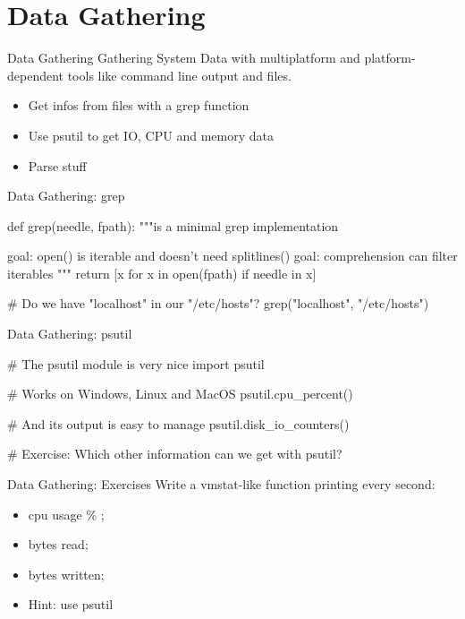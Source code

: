 \section{Data Gathering}
%
%


\begin{frame}{Data Gathering}
    Gathering System Data with multiplatform
     and platform-dependent tools like command
     line output and files.

\begin{itemize}
\item Get infos from files with a grep function
\item Use psutil to get IO, CPU and memory data
\item Parse stuff
\end{itemize}

\end{frame}


\begin{frame}[fragile]{Data Gathering: grep}
\begin{pythoncode}
def grep(needle, fpath):
    """is a minimal grep implementation

       goal: open() is iterable and doesn't
             need splitlines()
       goal: comprehension can filter iterables
    """
    return [x for x in open(fpath) if needle in x]
    
# Do we have "localhost" in our "/etc/hosts"?
grep("localhost", "/etc/hosts")
\end{pythoncode}
\end{frame}


\begin{frame}[fragile]{Data Gathering: psutil}
\begin{pythoncode}
# The psutil module is very nice
import psutil

# Works on Windows, Linux and MacOS
psutil.cpu_percent()

# And its output is easy to manage
psutil.disk_io_counters()

# Exercise: Which other information can we get with psutil?
\end{pythoncode}
\end{frame}


\begin{frame}[fragile]{Data Gathering: Exercises}
Write a vmstat-like function printing every second:
\begin{itemize}
\item cpu usage \% ;
\item bytes read;
\item bytes written;
\item Hint: use psutil
\end{itemize}
\end{frame}

